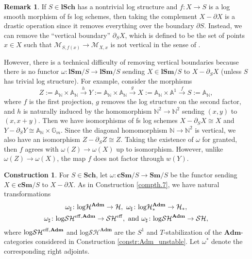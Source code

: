 \documentclass[11pt, a4paper]{amsart}
\theoremstyle{definition}
\newtheorem{const}[thm]{Construction}
\newtheorem{rmk}[thm]{Remark}
\numberwithin{equation}{subsection}
\newcommand{\N}{\mathbb{N}}
\newcommand{\A}{\mathbb{A}}
\newcommand{\G}{{\mathbb{G}}}
\newcommand{\Sch}{\mathbf{Sch}}
\newcommand{\lSch}{\mathbf{lSch}}
\newcommand{\Sm}{\mathbf{Sm}}
\newcommand{\lSm}{\mathbf{lSm}}
\newcommand{\cSm}{\mathbf{cSm}}
\newcommand{\Adm}{\mathbf{Adm}}
\newcommand{\cM}{\mathcal{M}}
\newcommand{\eff}{{\rm eff}}
\newcommand{\infSH}{\mathcal{SH}}
\newcommand{\infSHS}{\mathcal{SH}^{\eff}}
\newcommand{\infH}{\mathcal{H}}
\newcommand{\infHpt}{\mathcal{H}_{\ast}}
\newcommand{\inflogH}{\mathrm{log}\mathcal{H}}
\newcommand{\inflogHpt}{\mathrm{log}\mathcal{H}_\ast}
\newcommand{\inflogSH}{\mathrm{log}\mathcal{SH}}
\begin{document}
\begin{rmk}
If $S\in \lSch$ has a nontrivial log structure and $f\colon X\to S$ is a log smooth morphism of fs log schemes,
then taking the complement $X-\partial X$ is a drastic operation since it removes everything over the boundary 
$\partial S$.
Instead,
we can remove the ``vertical boundary'' $\partial_S X$,
which is defined to be the set of points $x\in X$ such that
$\cM_{S,f(x)}\to \cM_{X,x}$ is not vertical 
in the sense of \cite[Definition I.4.3.1]{Ogu}.

However,
there is a technical difficulty of removing vertical boundaries because there is no functor 
$\omega\colon \lSm/S\to \lSm/S$ sending $X\in \lSm/S$ to $X-\partial_S X$ 
(unless $S$ has trivial log structure).
For example,
consider the morphisms
\[
Z:=\A_\N\times \A_\N
\xrightarrow{h}
Y:=\A_\N\times \A_\N
\xrightarrow{g}
X:=\A_\N\times \A^1
\xrightarrow{f}
S:=\A_\N,
\]
where $f$ is the first projection,
$g$ removes the log structure on the second factor,
and $h$ is naturally induced by the homomorphism $\N^2\to \N^2$ sending $(x,y)$ to $(x,x+y)$.
Then we have isomorphisms of fs log schemes $X-\partial_S X\cong X$ and
$Y-\partial_S Y\cong \A_\N\times \G_m$.
Since the diagonal homomorphism $\N\to \N^2$ is vertical,
we also have an isomorphism $Z-\partial_S Z\cong Z$.
Taking the existence of $\omega$ for granted, 
then $f$ agrees with $\omega(Z)\to \omega(X)$ up to isomorphism.
However, unlike $\omega(Z)\to \omega(X)$, the map $f$ does not factor through $w(Y)$.
\end{rmk}

\begin{const}
\label{compth.13}
For $S\in \Sch$,
let $\omega\colon \cSm/S\to \Sm/S$ be the functor sending $X\in \cSm/S$ to $X-\partial X$.
As in Construction \ref{compth.7},
we have natural transformations
\begin{gather*}
\omega_\sharp
\colon
\inflogH^\Adm
\to
\infH,
\text{ }
\omega_\sharp
\colon
\inflogHpt^\Adm
\to
\infHpt,
\\
\omega_\sharp
\colon
\inflogSH^{\eff,\Adm}
\to
\infSHS,
\text{ and }
\omega_\sharp
\colon
\inflogSH^\Adm
\to
\infSH,
\end{gather*}
where ${\inflogSH}^{\eff,\Adm}$ and $\inflogSH^\Adm$ are the $S^1$ and $T$-stabilization of the $\Adm$-categories considered in Construction \ref{constr:Adm_unstable}. 
Let $\omega^*$ denote the corresponding right adjoints.
\end{const}
\end{document}
